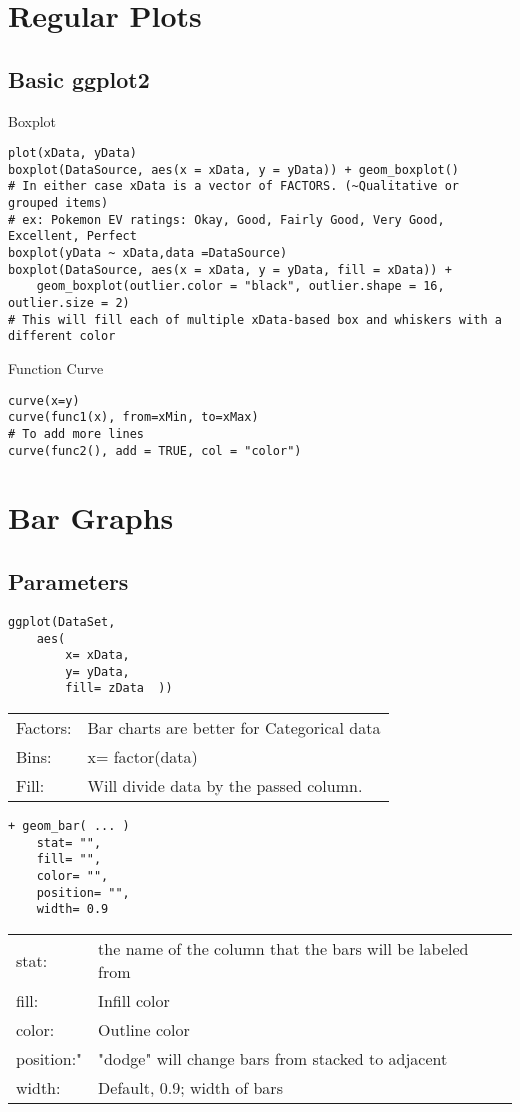 \documentclass[]{article}
\begin{document}
\section{Regular Plots}
\subsection{Basic ggplot2}
Boxplot
\begin{verbatim}
plot(xData, yData)
boxplot(DataSource, aes(x = xData, y = yData)) + geom_boxplot()
# In either case xData is a vector of FACTORS. (~Qualitative or grouped items)
# ex: Pokemon EV ratings: Okay, Good, Fairly Good, Very Good, Excellent, Perfect
boxplot(yData ~ xData,data =DataSource)
boxplot(DataSource, aes(x = xData, y = yData, fill = xData)) + 
	geom_boxplot(outlier.color = "black", outlier.shape = 16, outlier.size = 2)
# This will fill each of multiple xData-based box and whiskers with a different color
\end{verbatim}
Function Curve
\begin{verbatim}
curve(x=y)
curve(func1(x), from=xMin, to=xMax)
# To add more lines
curve(func2(), add = TRUE, col = "color")
\end{verbatim}

\section{Bar Graphs}

\subsection{Parameters}
\begin{verbatim}
ggplot(DataSet, 
	aes(
		x= xData,
		y= yData,
		fill= zData  ))
\end{verbatim}
\begin{tabular}{l l}
	Factors: & Bar charts are better for Categorical data \\
	Bins: & x= factor(data) \\
	Fill: & Will divide data by the passed column.  \\
\end{tabular}

\begin{verbatim}
+ geom_bar( ... )
	stat= "",
	fill= "",
	color= "",
	position= "",
	width= 0.9
\end{verbatim}
\begin{tabular}{l l}
	stat: & the name of the column that the bars will be labeled from \\
	fill: & Infill color \\
	color: & Outline color \\
	position:" & "dodge" will change bars from stacked to adjacent \\
	width: & Default, 0.9; width of bars \\
\end{tabular}
\end{document}
